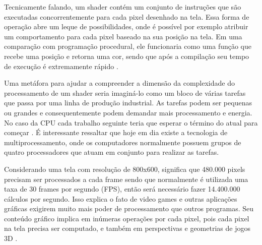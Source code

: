 	\begin{figure}[h!]
		\centering
	\end{figure}
	\nocite{figura5}

Tecnicamente falando, um shader contém um conjunto de instruções que são executadas concorrentemente para cada pixel desenhado na tela. Essa forma de operação abre um leque de possibilidades, onde é possível por exemplo atribuir um comportamento para cada pixel baseado na sua posição na tela. Em uma comparação com programação procedural, ele funcionaria como uma função que recebe uma posição e retorna uma cor, sendo que após a compilação seu tempo de execução é extremamente rápido \cite{bookOfShaders}.

Uma metáfora para ajudar a compreender a dimensão da complexidade do processamento de um shader seria imaginá-lo como um bloco de várias tarefas que passa por uma linha de produção industrial. As tarefas podem ser pequenas ou grandes e consequentemente podem demandar mais processamento e energia. No caso da CPU cada trabalho seguinte teria que esperar o término do atual para começar \cite{bookOfShaders}. É interessante ressaltar que hoje em dia existe a tecnologia de multiprocessamento, onde os computadores normalmente possuem grupos de quatro processadores que atuam em conjunto para realizar as tarefas.

Considerando uma tela com resolução de 800x600, significa que 480.000 pixels precisam ser processados a cada frame sendo que normalmente é utilizada uma taxa de 30 frames por segundo (\acrshort{FPS}), então será necessário fazer 14.400.000 cálculos por segundo. Isso explica o fato de video games e outras aplicações gráficas exigirem muito mais poder de processamento que outros programas. Seu conteúdo gráfico implica em inúmeras operações por cada pixel, pois cada pixel na tela precisa ser computado, e também em perspectivas e geometrias de jogos 3D \cite{bookOfShaders}.  

